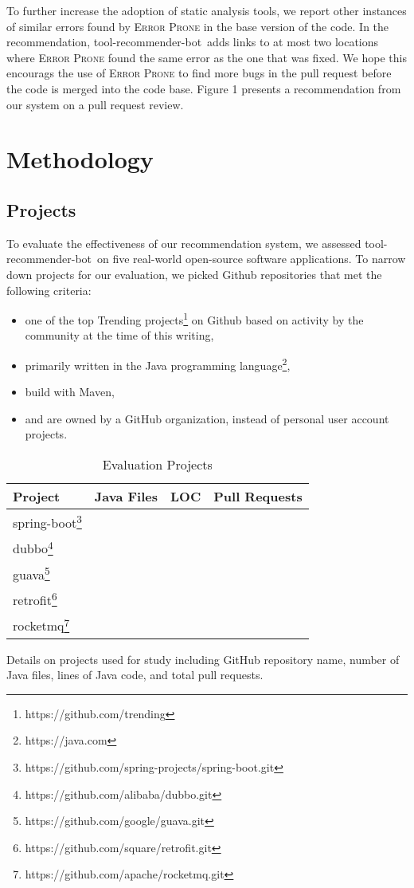 \documentclass[conference]{IEEEtran}
\newcommand{\tool}{tool-recommender-bot}
\begin{document}
To further increase the adoption of static analysis tools, we report other instances of similar errors found by \textsc{Error Prone} in the base version of the code. In the recommendation, \tool~adds links to at most two locations where \textsc{Error Prone} found the same error as the one that was fixed. We hope this encourags the use of \textsc{Error Prone} to find more bugs in the pull request before the code is merged into the code base. Figure 1 presents a recommendation from our system on a pull request review.

\section{Methodology}

\subsection{Projects}

To evaluate the effectiveness of our recommendation system, we assessed \tool~on five real-world open-source software applications. To narrow down projects for our evaluation, we picked Github repositories that met the following criteria:

\begin{itemize}
\item one of the top Trending projects\footnote{https://github.com/trending} on Github based on activity by the community at the time of this writing,
\item primarily written in the Java programming language\footnote{https://java.com},
\item build with Maven,
\item and are owned by a GitHub organization, instead of personal user account projects.
\end{itemize}

\begin{table}
	\centering
	\caption{Evaluation Projects}
	\begin{tabular}{|l|l|l|c|}
		\hline
		\textbf{Project} & \textbf{Java Files} & \textbf{LOC} & \textbf{Pull Requests} \\
		\hline
		spring-boot\footnote{https://github.com/spring-projects/spring-boot.git} &  &  & \\
		\hline
		dubbo\footnote{https://github.com/alibaba/dubbo.git} &  &  & \\
		\hline
		guava\footnote{https://github.com/google/guava.git}  &  &  & \\
		\hline
		retrofit\footnote{https://github.com/square/retrofit.git}  &  &  & \\
		\hline
		rocketmq\footnote{https://github.com/apache/rocketmq.git}  &  &  & \\
		\hline
		\end{tabular}
	\begin{tablenotes}
        \item[1] Details on projects used for study including GitHub repository name, number of Java files, lines of Java code, and total pull requests.
    \end{tablenotes}
	\label{tools}
\end{table}
\end{document}
